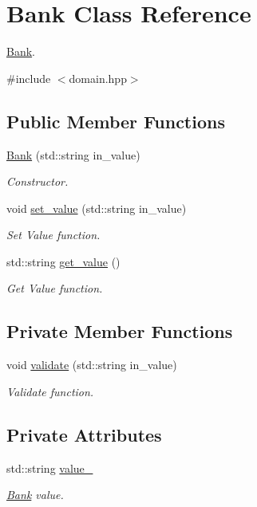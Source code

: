 \hypertarget{classBank}{}\section{Bank Class Reference}
\label{classBank}


\hyperlink{classBank}{Bank}.  




{\ttfamily \#include $<$domain.\+hpp$>$}

\subsection*{Public Member Functions}
\begin{DoxyCompactItemize}
\item 
\hyperlink{classBank_af25a8075483c3fe52b3a7c3e4b1ef9d3}{Bank} (std\+::string in\+\_\+value)
\begin{DoxyCompactList}\small\item\em Constructor. \end{DoxyCompactList}\item 
void \hyperlink{classBank_a3668d304d6fc9ae33692030549e8150e}{set\+\_\+value} (std\+::string in\+\_\+value)
\begin{DoxyCompactList}\small\item\em Set Value function. \end{DoxyCompactList}\item 
std\+::string \hyperlink{classBank_a0bfcce5686e1635a3213581844ffc380}{get\+\_\+value} ()
\begin{DoxyCompactList}\small\item\em Get Value function. \end{DoxyCompactList}\end{DoxyCompactItemize}
\subsection*{Private Member Functions}
\begin{DoxyCompactItemize}
\item 
void \hyperlink{classBank_aba4001bc4134bcaebae6391a332dbea2}{validate} (std\+::string in\+\_\+value)
\begin{DoxyCompactList}\small\item\em Validate function. \end{DoxyCompactList}\end{DoxyCompactItemize}
\subsection*{Private Attributes}
\begin{DoxyCompactItemize}
\item 
std\+::string \hyperlink{classBank_ac89db328904bdcef435122d99b3b7bfa}{value\+\_\+}
\begin{DoxyCompactList}\small\item\em \hyperlink{classBank}{Bank} value. \end{DoxyCompactList}\end{DoxyCompactItemize}
